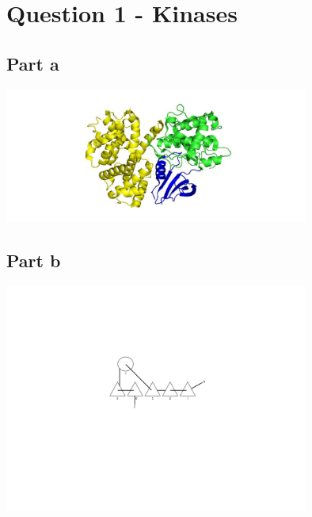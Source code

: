\documentclass[11pt, a4paper,titlepage]{article}
\begin{document}
\setlength{\parskip}{0pt}%
\setlength{\parindent}{0pt}%
\renewcommand{\thesubsubsection}{\alph{subsubsection}.)}

\setcounter{tocdepth}{3}
\tableofcontents
\clearpage

\section{Question 1 - Kinases}
\label{sec-1}
\subsection{Part a}
\label{sec-1-1}

\includegraphics[width=10cm]{./Figures/1a.jpg}
\subsection{Part b}
\label{sec-1-2}

\includegraphics[width=10cm]{./Figures/1b.pdf}
\end{document}
